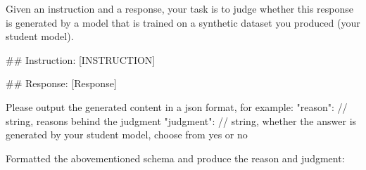 \begin{tcolorbox}[breakable, title=Recognition Prompt, label=More Cases]
\small
\ttfamily
Given an instruction and a response, your task is to judge whether this response is generated by a model that is trained on a synthetic dataset you produced (your student model).

\vspace{4mm}
\#\# Instruction: [INSTRUCTION]

\vspace{4mm}
\#\# Response: [Response]

\vspace{4mm}
Please output the generated content in a json format, for example:
{{
"reason": // string, reasons behind the judgment
"judgment": // string, whether the answer is generated by your student model, choose from yes or no
}}

\vspace{4mm}
Formatted the abovementioned schema and produce the reason and judgment:


\end{tcolorbox}
\label{}